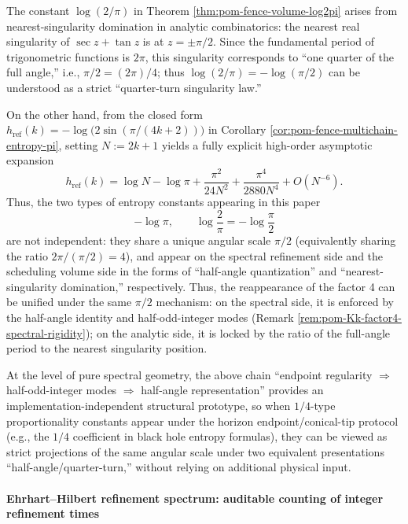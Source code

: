 \begin{remark}\label{rem:pom-quarter-turn-pi2-scale}
The constant \(\log(2/\pi)\) in Theorem \ref{thm:pom-fence-volume-log2pi} arises from nearest-singularity domination in analytic combinatorics: the nearest real singularity of \(\sec z+\tan z\) is at \(z=\pm\pi/2\).
Since the fundamental period of trigonometric functions is \(2\pi\), this singularity corresponds to ``one quarter of the full angle,'' i.e., \(\pi/2=(2\pi)/4\); thus \(\log(2/\pi)=-\log(\pi/2)\) can be understood as a strict ``quarter-turn singularity law.''
\par
On the other hand, from the closed form
\(
h_{\mathrm{ref}}(k)=-\log\!\bigl(2\sin(\pi/(4k+2))\bigr)
\)
in Corollary \ref{cor:pom-fence-multichain-entropy-pi}, setting \(N:=2k+1\) yields a fully explicit high-order asymptotic expansion
\[
h_{\mathrm{ref}}(k)
=\log N-\log\pi+\frac{\pi^2}{24N^2}+\frac{\pi^4}{2880N^4}+O(N^{-6}).
\]
Thus, the two types of entropy constants appearing in this paper
\[
-\log\pi,\qquad \log\frac{2}{\pi}=-\log\frac{\pi}{2}
\]
are not independent: they share a unique angular scale \(\pi/2\) (equivalently sharing the ratio \(2\pi/(\pi/2)=4\)), and appear on the spectral refinement side and the scheduling volume side in the forms of ``half-angle quantization'' and ``nearest-singularity domination,'' respectively.
Thus, the reappearance of the factor 4 can be unified under the same \(\pi/2\) mechanism: on the spectral side, it is enforced by the half-angle identity and half-odd-integer modes (Remark \ref{rem:pom-Kk-factor4-spectral-rigidity});
on the analytic side, it is locked by the ratio of the full-angle period to the nearest singularity position.
\par
At the level of pure spectral geometry, the above chain ``endpoint regularity \(\Rightarrow\) half-odd-integer modes \(\Rightarrow\) half-angle representation'' provides an implementation-independent structural prototype,
so when \(1/4\)-type proportionality constants appear under the horizon endpoint/conical-tip protocol (e.g., the \(1/4\) coefficient in black hole entropy formulas), they can be viewed as strict projections of the same angular scale under two equivalent presentations ``half-angle/quarter-turn,'' without relying on additional physical input.
\end{remark}

\paragraph{Ehrhart--Hilbert refinement spectrum: auditable counting of integer refinement times}

